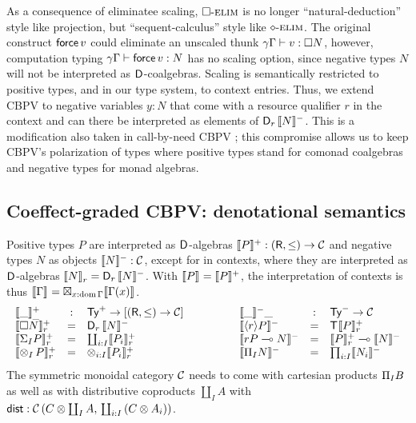 \documentclass[acmsmall,review,anonymous]{acmart}\settopmatter{printfolios=true,printccs=false,printacmref=false}
\begin{document}
As a consequence of eliminatee scaling, $\relim\Box$ is no longer
``natural-deduction'' style like projection, but ``sequent-calculus''
style like $\relim\diamond$.  The original construct $\force v$ could
eliminate an unscaled thunk $\qValTy \gamma \Gamma v {\Box N}$,
however, computation typing $\qCompTy \gamma \Gamma {\force v} N$ has
no scaling option, since negative types $N$ will not be interpreted as
$\D$-coalgebras.  Scaling is semantically restricted to positive
types, and in our type system, to context entries.  Thus, we extend
CBPV to negative variables $y : N$ that come with a resource qualifier
$r$ in the context and can there be interpreted as elements of
$\D[r]\,\denn N$.  This is a modification also taken in call-by-need
CBPV \citep{mcDermottMycroft:esop19}; this compromise allows us to
keep CBPV's polarization of types where positive types stand for
comonad coalgebras and negative types for monad algebras.


\subsection{Coeffect-graded CBPV: denotational semantics}



Positive types $P$ are interpreted as $\D$-algebras
$\denp P : (\R,\leq) \to \CC$ and negative types $N$ as objects
$\denn N : \CC$, except for in contexts, where they are interpreted as
$\D$-algebras $\Den N r = \D[r]\,\denn N$.  With $\den P = \denp P$,
the interpretation of contexts is thus
$\den \Gamma = \boxtimes_{x:\dom\Gamma} \den{\Gamma(x)}$.
\[
\begin{array}{lcl}
  \Denp\_\_ & : & \PTy \to [(\R,\leq) \to \CC] \\
  \Denp{\Box N}    r & = & \D[r]\, \denn N \\
  \Denp{\sumt I P} r & = & \coprod_{i:I} \Denp{P_i} r \\
  \Denp{\tupt I P} r & = & \otimes_{i:I} \Denp{P_i} r \\
\end{array}
\qquad\qquad
\begin{array}{lcl}
  \denn\_\_ & : & \NTy \to \CC \\
  \denn{\compty r P} & = & \T \Denp P r \\
  \denn{\qfun r P N} & = & \Denp P r \lolli \denn N \\
  \denn{\rect I N}   & = & \prod_{i:I} \denn{N_i} \\
\end{array}
\]
The symmetric monoidal category $\CC$ needs to come with cartesian
products $\rect I B$ as well as with distributive coproducts
$\coprod_I A$ with
$\tdist : \Hom {C \otimes \coprod_I A} {\coprod_{i:I} {(C \otimes A_i)}}$.
\end{document}
